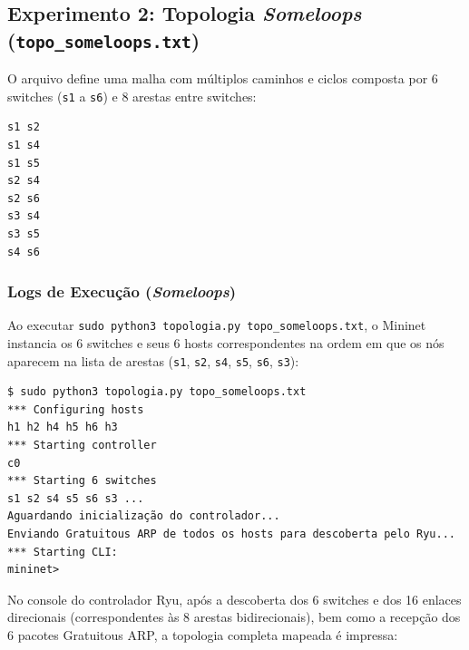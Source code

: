 \documentclass[12pt,a4paper]{article}
\begin{document}
\subsection{Experimento 2: Topologia \textit{Someloops} (\texttt{topo\_someloops.txt})}

O arquivo  define uma malha com múltiplos caminhos e ciclos composta por 6 switches (\texttt{s1} a \texttt{s6}) e 8 arestas entre switches:

\begin{lstlisting}[caption={Conteudo do arquivo topo\_someloops.txt}]
s1 s2
s1 s4
s1 s5
s2 s4
s2 s6
s3 s4
s3 s5
s4 s6
\end{lstlisting}

\subsubsection{Logs de Execução (\textit{Someloops})}

Ao executar \texttt{sudo python3 topologia.py topo\_someloops.txt}, o Mininet instancia os 6 switches e seus 6 hosts correspondentes na ordem em que os nós aparecem na lista de arestas (\texttt{s1}, \texttt{s2}, \texttt{s4}, \texttt{s5}, \texttt{s6}, \texttt{s3}):

\begin{lstlisting}[caption={Saida do terminal do Mininet para a topologia Someloops}]
$ sudo python3 topologia.py topo_someloops.txt
*** Configuring hosts
h1 h2 h4 h5 h6 h3 
*** Starting controller
c0 
*** Starting 6 switches
s1 s2 s4 s5 s6 s3 ...
Aguardando inicialização do controlador...
Enviando Gratuitous ARP de todos os hosts para descoberta pelo Ryu...
*** Starting CLI:
mininet> 
\end{lstlisting}

No console do controlador Ryu, após a descoberta dos 6 switches e dos 16 enlaces direcionais (correspondentes às 8 arestas bidirecionais), bem como a recepção dos 6 pacotes Gratuitous ARP, a topologia completa mapeada é impressa:
\end{document}
